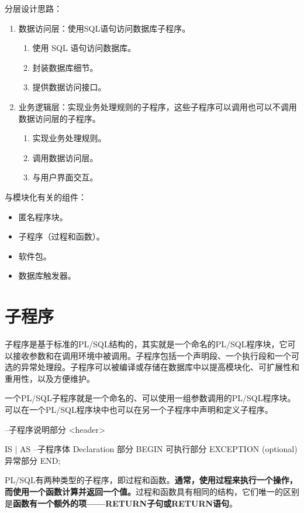 \documentclass[11pt, a4paper, oneside, UTF8]{ctexbook}
\let\kaishu\relax %
\begin{document}
分层设计思路：
\begin{enumerate}
  \item 数据访问层：使用SQL语句访问数据库子程序。
  \begin{enumerate}
    \item 使用 SQL 语句访问数据库。
    \item 封装数据库细节。
    \item 提供数据访问接口。
  \end{enumerate}
  \item 业务逻辑层：实现业务处理规则的子程序，这些子程序可以调用也可以不调用数据访问层的子程序。
  \begin{enumerate}
    \item 实现业务处理规则。
    \item 调用数据访问层。
    \item 与用户界面交互。
  \end{enumerate}
\end{enumerate}

与模块化有关的组件：
\begin{itemize}
  \item 匿名程序块。
  \item 子程序（过程和函数）。
  \item 软件包。
  \item 数据库触发器。
\end{itemize}

\section{子程序}
子程序是基于标准的PL/SQL结构的，其实就是一个命名的PL/SQL程序块，它可以接收参数和在调用环境中被调用。子程序包括一个声明段、一个执行段和一个可选的异常处理段。子程序可以被编译或存储在数据库中以提高模块化、可扩展性和重用性，以及方便维护。

一个PL/SQL子程序就是一个命名的、可以使用一组参数调用的PL/SQL程序块。可以在一个PL/SQL程序块中也可以在另一个子程序中声明和定义子程序。 

\begin{plsql}[caption=子程序语法模版]
--子程序说明部分
<header>

IS | AS
--子程序体
  Declaration 部分
BEGIN
  可执行部分
EXCEPTION (optional)
  异常部分
END;
\end{plsql}

PL/SQL有两种类型的子程序，即过程和函数。{\bfseries\kaishu 通常，使用过程来执行一个操作，而使用一个函数计算并返回一个值。}过程和函数具有相同的结构，它们唯一的区别是\textbf{函数有一个额外的项——RETURN子句或RETURN语句}。
\end{document}
